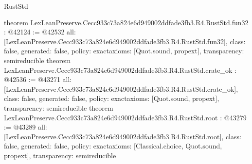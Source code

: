 \begin{lexlean}{RustStd}
\begin{coremodule}
{}
theorem LexLeanPreserve.Cecc933c73a824e6d949002ddfade3fb3.R4.RustStd.fun32 : @42124 := @42532 {
  all: [LexLeanPreserve.Cecc933c73a824e6d949002ddfade3fb3.R4.RustStd.fun32],
  class: false,
  generated: false,
  policy: exact{axioms: [Quot.sound, propext]},
  transparency: semireducible
}
theorem LexLeanPreserve.Cecc933c73a824e6d949002ddfade3fb3.R4.RustStd.crate_ok : @42536 := @43271 {
  all: [LexLeanPreserve.Cecc933c73a824e6d949002ddfade3fb3.R4.RustStd.crate_ok],
  class: false,
  generated: false,
  policy: exact{axioms: [Quot.sound, propext]},
  transparency: semireducible
}
theorem LexLeanPreserve.Cecc933c73a824e6d949002ddfade3fb3.R4.RustStd.root : @43279 := @43289 {
  all: [LexLeanPreserve.Cecc933c73a824e6d949002ddfade3fb3.R4.RustStd.root],
  class: false,
  generated: false,
  policy: exact{axioms: [Classical.choice, Quot.sound, propext]},
  transparency: semireducible
}


\end{coremodule}
\end{lexlean}
